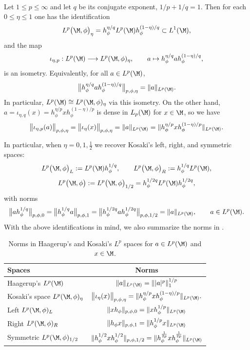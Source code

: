 \documentclass[sn-mathphys-num]{sn-jnl}
\begin{document}
\begin{theorem}\label{thm:iso-h-k}
Let $1\le p\le\infty$ and let $q$ be its conjugate exponent, $1/p+1/q=1$.  Then for each $0\le\eta\le1$ one has the identification
\[
L^p\bigl(\M,\phi\bigr)_\eta
 =
h_\phi^{\eta/q} L^p(\M) h_\phi^{(1-\eta)/q}
 \subset L^1(\M),
\]
and the map
\begin{equation}\label{eq:h-k-iso}
\iota_{\eta,p} :L^p(\M) \longrightarrow L^p(\M,\phi)_\eta,
\qquad
a\mapsto h_\phi^{\eta/q} a h_\phi^{(1-\eta)/q},
\end{equation}
is an isometry.  Equivalently, for all $a\in L^p(\M)$,
\[
\big\| h_\phi^{\eta/q} a h_\phi^{(1-\eta)/q}\big\|_{p,\phi,\eta}
=\|a\|_{L^p(\M)}.
\]
In particular, $L^p(\M)\cong L^p(\M,\phi)_\eta$ via this isometry.
On the other hand, $a=\iota_{\eta,q}(x)=h_\phi^{\eta/p} x h_\phi^{(1-\eta)/p}$ is dense in $L_{p}(\M)$ for $x\in \M$, so we have
\[
\big\| \iota_{\eta,p} (a)\big\|_{p,\phi,\eta}=\big\| \iota_{\eta}(x)\big\|_{p,\phi,\eta}
=\|a\|_{L^p(\M)}=\|h_\phi^{\eta/p} x h_\phi^{(1-\eta)/p}\|_{L^p(\M)}.
\]
\end{theorem}
In particular, when $\eta=0,1,\tfrac12$ we recover Kosaki's left, right, and symmetric spaces:
\[
  L^p\bigl(\M,\phi\bigr)_L
    :=L^p(\M) h_\phi^{1/q},
  \qquad
  L^p\bigl(\M,\phi\bigr)_R
    :=h_\phi^{1/q} L^p(\M),
\]
\begin{equation}\label{eq:sym-lp}
      L^p\bigl(\M,\phi\bigr)
    :=L^p\bigl(\M,\phi\bigr)_{1/2}
    =h_\phi^{1/2q} L^p(\M) h_\phi^{1/2q},
\end{equation}
with norms
\[
  \bigl\|a h_\phi^{1/q}\bigr\|_{p,\phi,0}
  = \bigl\| h_\phi^{1/q}a\bigr\|_{p,\phi,1}
  = \bigl\| h_\phi^{1/2q} a h_\phi^{1/2q}\bigr\|_{p,\phi,1/2}
  = \|a\|_{L^p(\M)},
  \qquad a\in L^p(\M).
\]
With the above identifications in mind, we also summarize the norms in .
\begin{table}[htbp]
\centering
\begin{tabular}{l c}
\hline
\textbf{Spaces} & \textbf{Norms} \\
\hline
Haagerup's $L^p(\M)$ & $\|a\|_{L^p(\M)} = \| |a|^p \|_{1}^{1/p}$ \\[4pt]
Kosaki's space $L^p(\M,\phi)_\eta$ &
$\big\| \iota_{\eta}(x)\big\|_{p,\phi,\eta}
=\|h_\phi^{\eta/p} x h_\phi^{(1-\eta)/p}\|_{L^p(\M)}.$ \\[4pt]
Left $L^p(\M,\phi)_L$ &
$\|x h_\phi\|_{p,\phi,0} = \|xh_\phi^{1/p}\|_{L^p(\M)}$ \\[4pt]

Right $L^p(\M,\phi)_R$ &
$\|h_\phi x\|_{p,\phi,1} = \|h_\phi^{1/p} x\|_{L^p(\M)}$ \\[4pt]

Symmetric $L^p(\M,\phi)_{1/2}$ &
$\|h_\phi^{1/2} x h_\phi^{1/2}\|_{p,\phi,1/2} = \|h_\phi^{\frac{1}{2p}} x h_\phi^{\frac{1}{2p}}\|_{L^p(\M)}$ \\[4pt]
\hline
\end{tabular}
\caption{Norms in Haagerup's and Kosaki's $L^p$ spaces for $a\in L^p(\M)$ and $x\in \M$.}
\label{tab:norm}
\end{table}
\end{document}

